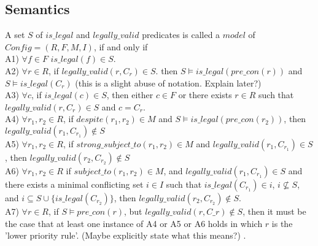 \subsection{Semantics}
A set $S$ of $is\_legal$ and $legally\_valid$ predicates is called a $model$ of $Config = (R,F,M,I)$, if and only if\\
\newline
A1) $\forall f \in F$ $is\_legal(f) \in S$.\\
\newline
A2) $\forall r \in R$, if $legally\_valid(r,C_{r}) \in S$. then $S\models is\_legal(pre\_con(r))$ and $S\models is\_legal(C_{r})$ (this is a slight abuse of notation. Explain later?) \\
\newline
A3) $\forall c$, if $is\_legal(c) \in S$, then either $c\in F$ or there exists $r \in R$ such that $legally\_valid(r,C_{r}) \in S$ and $c= C_{r}$.\\
\newline
A4) $\forall r_{1}, r_{2} \in R$, if $despite(r_{1}, r_{2}) \in M$ and $S\models is\_legal(pre\_con(r_{2}))$, then $legally\_valid(r_{1},C_{r_{1}}) \notin S$\\
\newline
A5) $\forall r_{1}, r_{2} \in R$, if $strong\_subject\_to(r_{1}, r_{2}) \in M$ and $legally\_valid(r_{1},C_{r_{1}}) \in S$, then $legally\_valid(r_{2},C_{r_{2}}) \notin S$\\
\newline
A6) $\forall r_{1},r_{2} \in R$ if $subject\_to(r_{1},r_{2}) \in M$, and $legally\_valid(r_{1},C_{r_{1}}) \in S$ and there exists a minimal conflicting set $i \in I$ such that $is\_legal(C_{r_{1}}) \in i$, $i\not\subseteq S$, and $i\subseteq S\cup \{is\_legal(C_{r_{2}})\}$, then $legally\_valid(r_{2},C_{r_{2}}) \notin S$.\\
\newline
A7) $\forall r\in R$, if $S\models pre\_con(r)$, but $legally\_valid(r,C\_{r})\notin S$, then it must be the case that at least one instance of A4 or A5 or A6 holds in which $r$ is the 'lower priority rule'. (Maybe explicitly state what this means?)   .

